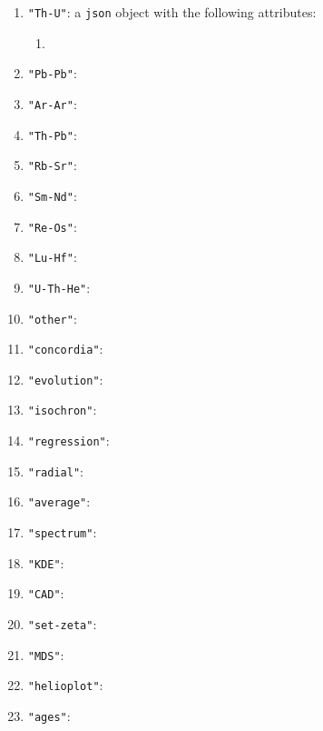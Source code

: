 \begin{refsection}
\begin{enumerate}[leftmargin=\parindent,align=left,
      labelwidth=\parindent,label*=2.\arabic*.]
\begin{enumerate}[leftmargin=0,align=left,labelwidth=\parindent,label*=\arabic*.]
    eponymous argument of the \texttt{age()}, \texttt{radialplot()},
    \texttt{weightedmean()}, \texttt{kde()} and \texttt{cad()}
    functions.
  \item{\tt cutoff76}: stores the value for the eponymous argument of
    the \texttt{age()}, \texttt{radialplot()},
    \texttt{weightedmean()}, \texttt{kde()} and \texttt{cad()}
    functions.
  \item{\tt cutoffdisc}: either 0 (no discordance filter), 1
    (discordance filter to be used before common Pb correction), or 2
    (discordance filter to be used after common Pb correction).
  \item{\tt discoption}: a number from 0 to 5, storing the value to be
    passed on to the \texttt{option} argument of the
    \texttt{discfilter} function.
  \item{\tt mindisc}: a 5-element vector of minimum discordance cutoff
    values (one for each of \texttt{discoption}'s values 1 through 5),
    to be used in \texttt{discfilter()}'s \texttt{cutoff} argument.
  \item{\tt maxdisc}: a 5-element vector of maximum discordance cutoff
    values (one for each of \texttt{discoption}'s values 1 through 5),
    to be used in \texttt{discfilter()}'s \texttt{cutoff} argument.
  \end{enumerate}
\item{\tt "Th-U"}: a \texttt{json} object with the following
  attributes:
  \begin{enumerate}
    \item{\tt} 
  \end{enumerate}
\item{\tt "Pb-Pb"}:
\item{\tt "Ar-Ar"}:
\item{\tt "Th-Pb"}:
\item{\tt "Rb-Sr"}:
\item{\tt "Sm-Nd"}:
\item{\tt "Re-Os"}:
\item{\tt "Lu-Hf"}:
\item{\tt "U-Th-He"}:
\item{\tt "other"}:
\item{\tt "concordia"}:
\item{\tt "evolution"}:
\item{\tt "isochron"}:
\item{\tt "regression"}:
\item{\tt "radial"}:
\item{\tt "average"}:
\item{\tt "spectrum"}:
\item{\tt "KDE"}:
\item{\tt "CAD"}:
\item{\tt "set-zeta"}:
\item{\tt "MDS"}:
\item{\tt "helioplot"}:
\item{\tt "ages"}:
\end{enumerate}


\end{refsection}
